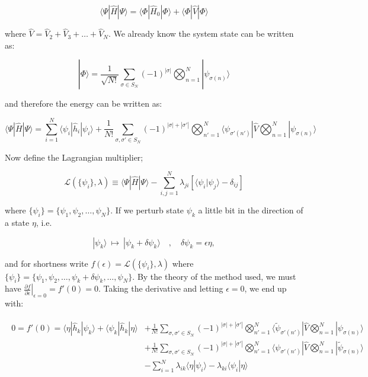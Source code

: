 \documentclass[10pt]{report}
\begin{document}
	\begin{equation}
		\langle\Psi|\hat{H}|\Psi\rangle = \langle\Phi|\hat{H}_0|\Phi\rangle + \langle\Phi|\hat{V}|\Phi\rangle
	\end{equation}
	
	where $\hat{V} = \hat{V}_2 + \hat{V}_3 + \ldots + \hat{V}_N$. We already know the system state can be written as:
	
	\begin{equation}
		|\Phi\rangle = \frac{1}{\sqrt{N!}}\sum_{\sigma\in S_N} (-1)^{|\sigma|}\bigotimes_{n=1}^N |\psi_{\sigma(n)}\rangle
	\end{equation}
	
	and therefore the energy can be written as:
	
	\begin{equation}
		\langle\Psi|\hat{H}|\Psi\rangle = \sum_{i=1}^N\langle\psi_i|\hat{h}_i|\psi_i\rangle + \frac{1}{N!}\sum_{\sigma,\sigma'\in S_N} (-1)^{|\sigma|+|\sigma'|}\bigotimes_{n'=1}^N \langle\psi_{\sigma'(n')}|\hat{V}\bigotimes_{n=1}^N |\psi_{\sigma(n)}\rangle
	\end{equation}
	
	Now define the Lagrangian multiplier;
	
	\begin{equation}
		\mathcal{L}\left( \{\psi_i\},\lambda \right) \equiv \langle\Psi|\hat{H}|\Psi\rangle - \sum_{i,j=1}^N \lambda_{ji}\left[ \langle\psi_i|\psi_j\rangle - \delta_{ij} \right]
	\end{equation}
	
	where $\{\psi_i\} = \{\psi_1,\psi_2,\ldots,\psi_N\}$. If we perturb state $\psi_k$ a little bit in the direction of a state $\eta$, i.e.
	
	\begin{equation}
		|\psi_k\rangle \:\mapsto\: |\psi_k + \delta\psi_k\rangle \quad,\quad \delta\psi_k = \epsilon\eta,
	\end{equation}
	
	and for shortness write $f(\epsilon) = \mathcal{L}\left( \{\psi_i\},\lambda \right)$ where $\{\psi_i\} = \{\psi_1,\psi_2,\ldots,\psi_k+\delta\psi_k,\ldots,\psi_N\}$. By the theory of the method used, we must have $\left.\frac{\partial f}{\partial\epsilon}\right|_{\epsilon=0} = f'(0) = 0$. Taking the derivative and letting $\epsilon=0$, we end up with:
	
	\begin{align}
		\begin{split}
		0 = f'(0) =  \langle\eta|\hat{h}_k|\psi_k\rangle + \langle\psi_k|\hat{h}_k|\eta\rangle &+ \frac{1}{N!}\sum_{\sigma,\sigma'\in S_N} (-1)^{|\sigma|+|\sigma'|}\bigotimes_{n'=1}^N \langle\widetilde{\psi}_{\sigma'(n')}|\hat{V}\bigotimes_{n=1}^N |\psi_{\sigma(n)}\rangle\\
		&+ \frac{1}{N!}\sum_{\sigma,\sigma'\in S_N} (-1)^{|\sigma|+|\sigma'|}\bigotimes_{n'=1}^N \langle\psi_{\sigma'(n')}|\hat{V}\bigotimes_{n=1}^N |\widetilde{\psi}_{\sigma(n)}\rangle\\
		&- \sum_{i=1}^N \lambda_{ik}\langle\eta|\psi_i\rangle - \lambda_{ki}\langle\psi_i|\eta\rangle
		\end{split}
	\end{align}
	
\end{document}
